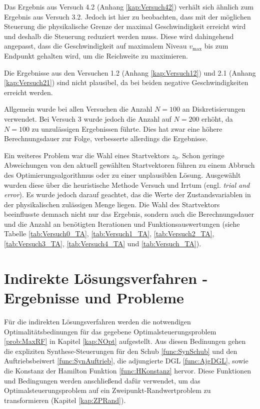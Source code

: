 Das Ergebnis aus Versuch 4.2 (Anhang \ref{kap:Versuch42}) verhält sich ähnlich zum Ergebnis aus Versuch 3.2. Jedoch ist hier zu beobachten, dass mit der möglichen Steuerung die physikalische Grenze der maximal Geschwindigkeit erreicht wird und deshalb die Steuerung reduziert werden muss. Diese wird dahingehend angepasst, dass die Geschwindigkeit auf maximalem Niveau $v_{\max}$ bis zum Endpunkt gehalten wird, um die Reichweite zu maximieren.

Die Ergebnisse aus den Versuchen 1.2 (Anhang \ref{kap:Versuch12}) und 2.1 (Anhang \ref{kap:Versuch21}) sind nicht plausibel, da bei beiden negative Geschwindigkeiten erreicht werden.

Allgemein wurde bei allen Versuchen die Anzahl $N = 100$ an Diskretisierungen verwendet. Bei Versuch 3 wurde jedoch die Anzahl auf $N = 200$ erhöht, da $N=100$ zu unzulässigen Ergebnissen führte. Dies hat zwar eine höhere Berechnungsdauer zur Folge, verbesserte allerdings die Ergebnisse.

Ein weiteres Problem war die Wahl eines Startvektors $z_0$. Schon geringe Abweichungen von den aktuell gewählten Startvektoren führen zu einem Abbruch des Optimierungsalgorithmus oder zu einer unplausiblen Lösung. Ausgewählt wurden diese über die heuristische Methode \glqq Versuch und Irrtum\grqq{} (engl. \textit{trial and error}). Es wurde jedoch darauf geachtet, das die Werte der Zustandsvariablen in der physikalischen zulässigen Menge liegen. Die Wahl des Startvektors beeinflusste demnach nicht nur das Ergebnis, sondern auch die Berechnungsdauer und die Anzahl an benötigten Iterationen und Funktionsauswertungen (siehe Tabelle \ref{tab:Versuch0_TA}, \ref{tab:Versuch1_TA}, \ref{tab:Versuch2_TA}, \ref{tab:Versuch3_TA}, \ref{tab:Versuch4_TA} und \ref{tab:Versuch_TA}).





\section{Indirekte Lösungsverfahren - Ergebnisse und Probleme}\label{kap:LSGIndirekt}
Für die indirekten Lösungsverfahren werden die notwendigen Optimalitätsbedinungen für das gegebene Optimalsteuerungsproblem \ref{prob:MaxRF} in Kapitel \ref{kap:NOpt} aufgestellt. Aus diesen Bedinungen gehen die expliziten Synthese-Steuerungen für den Schub \ref{func:SynSchub} und den Auftriebsbeiwert \ref{func:SynAuftrieb}, die adjungierte DGL \ref{func:AjgDGL}, sowie die Konstanz der Hamilton Funktion \ref{func:HKonstanz} hervor. Diese Funktionen und Bedingungen werden anschließend dafür verwendet, um das Optimalsteuerungsproblem auf ein Zweipunkt-Randwertproblem zu transformieren (Kapitel \ref{kap:ZPRand}).

